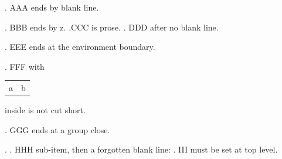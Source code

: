

\ex. AAA ends by blank line.

\ex. BBB ends by z. \z.CCC is prose.
\ex. DDD after no blank line.

\begin{minipage}{0.9\textwidth}
\ex. EEE ends at the environment boundary.\end{minipage}

\ex. FFF with \begin{tabular}{ll} a & b \end{tabular} inside is not cut short.

{\ex. GGG ends at a group close.}

\ex.
\a. HHH sub-item, then a forgotten blank line:
\ex. III must be set at top level.

